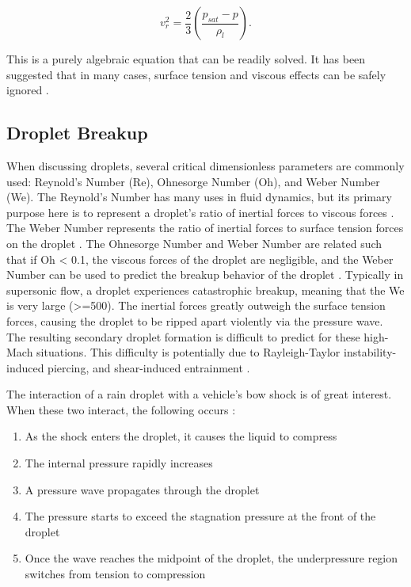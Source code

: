 \documentclass{UCF_ETD}
\begin{document}
\begin{equation}
    v_{r}^{2} = \frac{2}{3} \left( \frac{p_{sat} - p}{\rho_{l}} \right).
    \label{eq:schnerr-sauer}
\end{equation}

This is a purely algebraic equation that can be readily solved. It has been suggested that in many cases, surface tension and viscous effects can be safely ignored \cite{CavitationBubbleDynamics}. 

\subsection{Droplet Breakup}

When discussing droplets, several critical dimensionless parameters are commonly used: Reynold’s Number (Re), Ohnesorge Number (Oh), and Weber Number (We). The Reynold’s Number has many uses in fluid dynamics, but its primary purpose here is to represent a droplet’s ratio of inertial forces to viscous forces \cite{Cao2020NumericalSO}. The Weber Number represents the ratio of inertial forces to surface tension forces on the droplet \cite{Cao2020NumericalSO}. The Ohnesorge Number and Weber Number are related such that if Oh < 0.1, the viscous forces of the droplet are negligible, and the Weber Number can be used to predict the breakup behavior of the droplet \cite{Cao2020NumericalSO}. Typically in supersonic flow, a droplet experiences catastrophic breakup, meaning that the We is very large (>=500). The inertial forces greatly outweigh the surface tension forces, causing the droplet to be ripped apart violently via the pressure wave. The resulting secondary droplet formation is difficult to predict for these high-Mach situations. This difficulty is potentially due to Rayleigh-Taylor instability-induced piercing, and shear-induced entrainment \cite{Theofanus}. 

The interaction of a rain droplet with a vehicle's bow shock is of great interest. When these two interact, the following occurs \cite{Moylan2010RaindropDI, Forehand2024}:

\begin{enumerate}
    \item As the shock enters the droplet, it causes the liquid to compress
    \item The internal pressure rapidly increases
    \item A pressure wave propagates through the droplet
    \item The pressure starts to exceed the stagnation pressure at the front of the droplet
    \item Once the wave reaches the midpoint of the droplet, the underpressure region switches from tension to compression
\end{enumerate}
\end{document}
